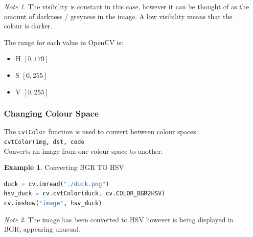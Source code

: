 \documentclass{article}
\theoremstyle{definition}
\newtheorem{ex}{Example}[subsection]
\theoremstyle{remark}
\newtheorem*{nb}{Note}
\newcommand{\func}[2]{\noindent\lstinline{#1}\\#2}
\begin{document}
\begin{nb}
    The visibility is constant in this case, however it can be thought of as the amount of darkness / greyness in the image. A low visibility means that the colour is darker.
\end{nb}

\noindent The range for each value in OpenCV is:
\begin{itemize}
    \item H $ [0, 179] $
    \item S $ [0, 255] $
    \item V $ [0, 255] $
\end{itemize}

\subsubsection{Changing Colour Space}

The \lstinline{cvtColor} function is used to convert between colour spaces.\\

\func{cvtColor(img, dst, code}{Converts an image from one colour space to another.\\}


\begin{ex}Converting BGR TO HSV
\begin{lstlisting}[language=Python]
duck = cv.imread("./duck.png")
hsv_duck = cv.cvtColor(duck, cv.COLOR_BGR2HSV)
cv.imshow("image", hsv_duck)
\end{lstlisting}

\begin{nb}
The image has been converted to HSV however is being displayed in BGR; appearing unusual.
\end{nb}
\end{ex}
\end{document}
